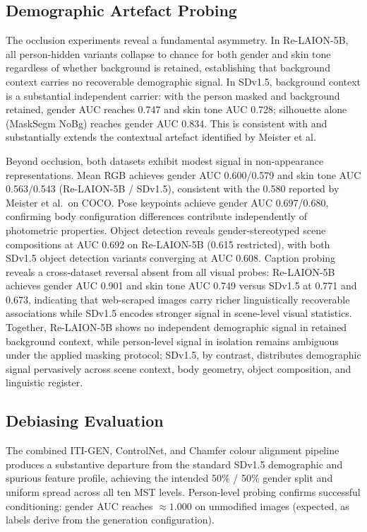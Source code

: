 \subsection{Demographic Artefact Probing}

The occlusion experiments reveal a fundamental asymmetry. In Re-LAION-5B, all
person-hidden variants collapse to chance for both gender and skin tone regardless of
whether background is retained, establishing that background context carries no
recoverable demographic signal. In SDv1.5, background context is a substantial
independent carrier: with the person masked and background retained, gender AUC reaches
0.747 and skin tone AUC 0.728; silhouette alone (MaskSegm NoBg) reaches gender AUC
0.834. This is consistent with and substantially extends the contextual artefact
identified by Meister et al.

Beyond occlusion, both datasets exhibit modest signal in non-appearance representations.
Mean RGB achieves gender AUC 0.600/0.579 and skin tone AUC 0.563/0.543 (Re-LAION-5B /
SDv1.5), consistent with the 0.580 reported by Meister et al.\ on COCO. Pose keypoints
achieve gender AUC 0.697/0.680, confirming body configuration differences contribute
independently of photometric properties. Object detection reveals gender-stereotyped scene
compositions at AUC 0.692 on Re-LAION-5B (0.615 restricted), with both SDv1.5
object detection variants converging at AUC 0.608. Caption probing reveals a cross-dataset reversal
absent from all visual probes: Re-LAION-5B achieves gender AUC 0.901 and skin tone AUC
0.749 versus SDv1.5 at 0.771 and 0.673, indicating that web-scraped images carry richer
linguistically recoverable associations while SDv1.5 encodes stronger signal in
scene-level visual statistics. Together, Re-LAION-5B shows no independent demographic signal in retained background context,
while person-level signal in isolation remains ambiguous under the applied masking protocol; SDv1.5,
by contrast, distributes demographic signal pervasively across scene context, body geometry, object composition, and linguistic register.

\subsection{Debiasing Evaluation}

The combined ITI-GEN, ControlNet, and Chamfer colour alignment pipeline produces a
substantive departure from the standard SDv1.5 demographic and spurious feature profile,
achieving the intended 50\% / 50\% gender split and uniform spread across all ten MST
levels. Person-level probing confirms successful conditioning: gender AUC reaches
${\approx}1.000$ on unmodified images (expected, as labels derive from the generation
configuration).

